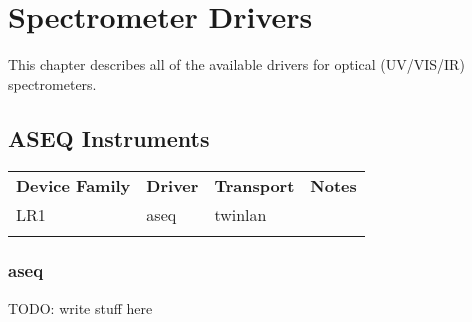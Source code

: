 \chapter{Spectrometer Drivers}
\label{sec:misc-drivers}

This chapter describes all of the available drivers for optical (UV/VIS/IR) spectrometers.

\section{ASEQ Instruments}

\begin{tabularx}{16cm}{lllX}
\thickhline
\textbf{Device Family} & \textbf{Driver} & \textbf{Transport} & \textbf{Notes} \\
\thickhline
LR1 & aseq & twinlan & \\
\thickhline
\end{tabularx}

\subsection{aseq}

TODO: write stuff here
